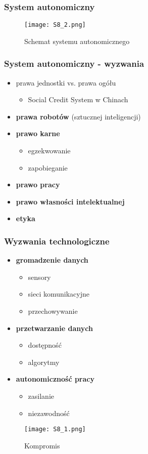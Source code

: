 \subsubsection{System autonomiczny}

\begin{figure}[H]
	\centering
	\texttt{[image: S8\_2.png]}
	\caption{Schemat systemu autonomicznego}
\end{figure}

\subsubsection{System autonomiczny - wyzwania}

\begin{itemize}
	\item prawa jednostki vs. prawa ogółu
	\begin{itemize}
		\item Social Credit System w Chinach
	\end{itemize}
	\item \textbf{prawa robotów} (sztucznej inteligencji)
	\item \textbf{prawo karne}
	\begin{itemize}
		\item egzekwowanie
		\item zapobieganie
	\end{itemize}
	\item \textbf{prawo pracy}
	\item \textbf{prawo własności intelektualnej}
	\item \textbf{etyka}
\end{itemize}

\subsubsection{Wyzwania technologiczne}

\begin{itemize}
	\item \textbf{gromadzenie danych}
	\begin{itemize}
		\item sensory
		\item sieci komunikacyjne
		\item przechowywanie
	\end{itemize}
	\item \textbf{przetwarzanie danych}
	\begin{itemize}
		\item dostępność
		\item algorytmy
	\end{itemize}
	\item \textbf{autonomiczność pracy}
	\begin{itemize}
		\item zasilanie
		\item niezawodność
	\end{itemize}
\end{itemize}

\begin{figure}[H]
	\centering
	\texttt{[image: S8\_1.png]}
	\caption{Kompromis}
\end{figure}

